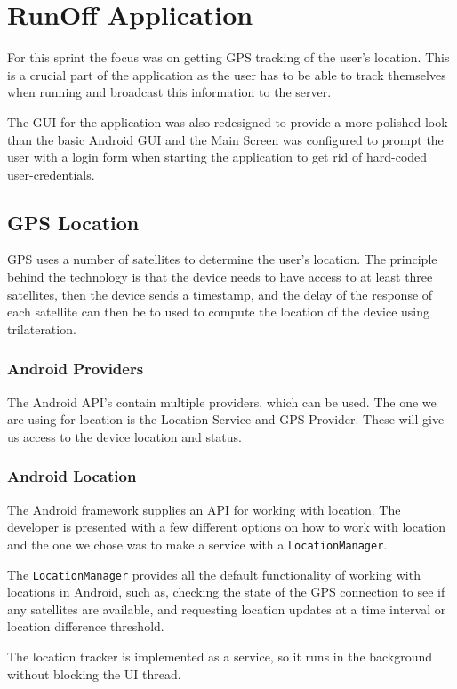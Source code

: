 \section{RunOff Application}
For this sprint the focus was on getting \ac{GPS} tracking of the user's location. This is a crucial part of the application as the user has to be able to track themselves when running and broadcast this information to the server.

The \ac{GUI} for the application was also redesigned to provide a more polished look than the basic Android \ac{GUI} and the Main Screen was configured to prompt the user with a login form when starting the application to get rid of hard-coded user-credentials.

\subsection{GPS Location}
\ac{GPS} uses a number of satellites to determine the user's location.
The principle behind the technology is that the device needs to have access to at least three satellites, then the device sends a timestamp, and the delay of the response of each satellite can then be to used to compute the location of the device using trilateration.

\subsubsection{Android Providers}
The Android \ac{API}'s contain multiple providers, which can be used. The one we are using for location is the Location Service and \ac{GPS} Provider. These will give us access to the device location and status.

\subsubsection{Android Location}
The Android framework supplies an \ac{API} for working with location.
The developer is presented with a few different options on how to work with location and the one we chose was to make a service with a \texttt{LocationManager}.

The \texttt{LocationManager} provides all the default functionality of working with locations in Android, such as, checking the state of the \ac{GPS} connection to see if any satellites are available, and requesting location updates at a time interval or location difference threshold.

The location tracker is implemented as a service, so it runs in the background without blocking the \ac{UI} thread.

